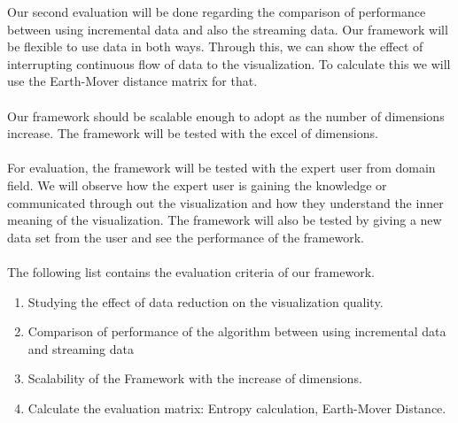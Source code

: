 Our second evaluation will be done regarding the comparison of performance between using incremental data and also the streaming data. Our framework will be flexible to use data in both ways. Through this, we can show the effect of interrupting continuous flow of data to the visualization. To calculate this we will use the Earth-Mover distance matrix for that. \\\\
Our framework should be scalable enough to adopt as the number of dimensions increase. The framework will be tested with the excel of dimensions. \\\\
For evaluation, the framework will be tested with the expert user from domain field. We will observe how the expert user is gaining the knowledge or communicated through out the visualization and how they understand the inner meaning of the visualization. The framework will also be tested by giving a new data set from the user and see the performance of the framework.\\\\

The following list contains the evaluation criteria of our framework.
\begin{enumerate}
	\item Studying the effect of data reduction on the visualization quality. 
	\item Comparison of performance of the algorithm between using incremental data and streaming data
	\item Scalability of the Framework with the increase of dimensions.
	\item Calculate the evaluation matrix: Entropy calculation, Earth-Mover Distance.
\end{enumerate}